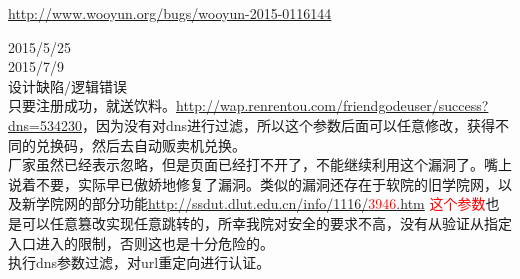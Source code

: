 \documentclass{leptc}
\begin{document}
    \begin{center}
    	\url{http://www.wooyun.org/bugs/wooyun-2015-0116144}
    \end{center}
     2015/5/25 \\
     2015/7/9 \\
     设计缺陷/逻辑错误 \\
     只要注册成功，就送饮料。\url{http://wap.renrentou.com/friendgodeuser/success?dns=534230}，因为没有对dns进行过滤，所以这个参数后面可以任意修改，获得不同的兑换码，然后去自动贩卖机兑换。\\
     厂家虽然已经表示忽略，但是页面已经打不开了，不能继续利用这个漏洞了。嘴上说着不要，实际早已傲娇地修复了漏洞。类似的漏洞还存在于软院的旧学院网，以及新学院网的部分功能\href{http://ssdut.dlut.edu.cn/info/1116/3946.htm}{http://ssdut.dlut.edu.cn/info/1116/\textcolor{red}{3946}.htm} \textcolor{red}{这个参数}也是可以任意篡改实现任意跳转的，所幸我院对安全的要求不高，没有从验证从指定入口进入的限制，否则这也是十分危险的。\\
     执行dns参数过滤，对url重定向进行认证。\\
    
\end{document}
